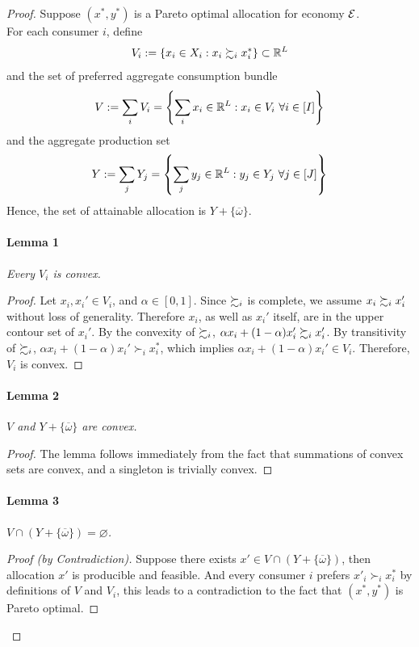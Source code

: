 \documentclass{report}
\begin{document}
		\begin{proof}
			Suppose $(x^*, y^*)$ is a Pareto optimal allocation for economy $\mathcal{{E}}$.\\
			For each consumer $i$, define
			\begin{equation}
				V_i := \{x_i \in X_i: x_i \succsim_i x_i^*\} \subset \mathbb{R}^L
			\end{equation}
			and the set of preferred aggregate consumption bundle
			\begin{equation}
				V := \sum_i V_i = \left \{
					\sum_i x_i \in \mathbb{R}^L:
					x_i \in V_i\ \forall i \in [I]
				\right \}
			\end{equation}
			and the aggregate production set
			\begin{equation}
				Y := \sum_j Y_j = \left \{
					\sum_j y_j \in \mathbb{R}^L:
					y_j \in Y_j\ \forall j \in [J]
				\right \}
			\end{equation}
			Hence, the set of attainable allocation is $Y + \{ \overline{\omega} \}$.
			\paragraph{Lemma 1} \emph{Every $V_i$ is convex.}
			\begin{proof}
				Let $x_i, x_i' \in V_i$, and $\alpha \in [0, 1]$. Since $\succsim_i$ is complete, we assume $x_i \succsim_i x_i'$ without loss of generality. Therefore $x_i$, as well as $x_i'$ itself, are in the upper contour set of $x_i'$. By the convexity of $\succsim_i$, $\alpha x_i + (1 - \alpha) x_i' \succsim_i x_i'$. By transitivity of $\succsim_i$, $\alpha x_i + (1 - \alpha) x_i' \succ_i x_i^*$, which implies $\alpha x_i + (1 - \alpha) x_i' \in V_i$. Therefore, $V_i$ is convex.
			\end{proof}
			\paragraph{Lemma 2} \emph{$V$ and $Y + \{\overline{\omega}\}$ are convex.}
			\begin{proof}
				The lemma follows immediately from the fact that summations of convex sets are convex, and a singleton is trivially convex.
			\end{proof}
			\paragraph{Lemma 3} \emph{$V \cap (Y + \{\overline{\omega}\}) = \varnothing$.}
			\begin{proof}[Proof (by Contradiction)]
				Suppose there exists $x' \in V \cap (Y + \{\overline{\omega}\})$, then allocation $x'$ is producible and feasible. And every consumer $i$ prefers $x'_i \succ_i x_i^*$ by definitions of $V$ and $V_i$, this leads to a contradiction to the fact that $(x^*, y^*)$ is Pareto optimal.
			\end{proof}

\end{proof}
\end{document}
